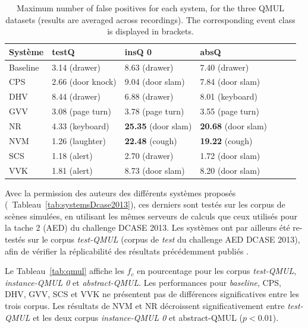 \begin{table}
\begin{center} 
\begin{tabular}{lllllll}  
  Système &   testQ                  &  insQ 0                            &   absQ          \\
 \hline
 Baseline & 3.14 \hfill (drawer)     &  8.63 \hfill (drawer)              &  7.40 \hfill  (drawer) \\
      CPS & 2.66 \hfill (door knock) &  9.04 \hfill (door slam)           &  7.84 \hfill (door slam) \\
      DHV & 8.44 \hfill (drawer)     &  6.88 \hfill (drawer)              &  8.01 \hfill (keyboard) \\
      GVV & 3.08 \hfill (page turn)  &  3.78 \hfill (page turn)           &  3.55 \hfill (page turn) \\
      NR  & 4.33 \hfill (keyboard)   & \textbf{25.35} \hfill (door slam)  & \textbf{20.68 } \hfill (door slam) \\
      NVM & 1.26 \hfill (laughter)   & \textbf{22.48} \hfill (cough)      & \textbf{19.22}  \hfill (cough) \\
      SCS & 1.18 \hfill (alert)      &  2.70 \hfill (drawer)              &  1.72 \hfill (door slam) \\
      VVK & 1.81 \hfill (alert)      &  8.73 \hfill (door slam)           &  8.20 \hfill (door slam) \\ 
       \hline
\end{tabular}
\end{center} 
\caption{Maximum number of false positives for each system, for the three QMUL datasets (results are averaged across recordings). The corresponding event class is displayed in brackets.}
\label{tab:fp}
\end{table}

Avec la permission des auteurs des différents systèmes proposés (\cf~Tableau~\ref{tab:systemsDcase2013}), ces derniers sont testés sur les corpus de scènes simulées, en utilisant les mêmes serveurs de calculs que ceux utilisés pour la tache 2 (AED) du challenge DCASE 2013. Les systèmes ont par ailleurs été re-testés sur le corpus \emph{test-QMUL} (corpus de \emph{test} du challenge AED DCASE 2013), afin de vérifier la réplicabilité des résultats précédemment publiés \citep{Stowell15}.

Le Tableau~\ref{tab:qmul} affiche les $f_c$ en pourcentage pour les corpus \emph{test-QMUL}, \emph{instance-QMUL 0} et \emph{abstract-QMUL}. Les performances pour \emph{baseline}, CPS, DHV, GVV, SCS et VVK ne présentent pas de différences significatives entre les trois corpus. Les résultats de NVM et NR décroissent significativement entre \emph{test-QMUL} et les deux corpus \emph{instance-QMUL 0} et abstract-QMUL ($p<0.01$).

